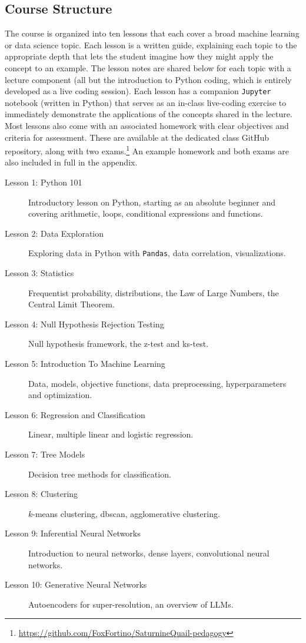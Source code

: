 \subsection{Course Structure}\label{sec:coursestructure}
The course is organized into ten lessons that each cover a broad machine learning or data science topic. Each lesson is a written guide, explaining each topic to the appropriate depth that lets the student imagine how they might apply the concept to an example. The lesson notes are shared below for each topic with a lecture component (all but the introduction to Python coding, which is entirely developed as a live coding session). Each lesson has a companion \texttt{Jupyter} notebook (written in Python) that serves as an in-class live-coding exercise to immediately demonstrate the applications of the concepts shared in the lecture. Most lessons also come with an associated homework with clear objectives and criteria for assessment. These are available at the dedicated class GitHub repository, along with two exams.\footnote{\url{https://github.com/FoxFortino/SaturnineQuail-pedagogy}} An example homework and both exams are also included in full in the appendix.

\begin{description}
    \item[Lesson 1: Python 101] Introductory lesson on Python, starting as an absolute beginner and covering arithmetic, loops, conditional expressions and functions.
    \item[Lesson 2: Data Exploration] Exploring data in Python with \texttt{Pandas}, data correlation, visualizations.
    \item[Lesson 3: Statistics] Frequentist probability, distributions, the Law of Large Numbers, the Central Limit Theorem.
    \item[Lesson 4: Null Hypothesis Rejection Testing] Null hypothesis framework, the z-test and ks-test.
    \item[Lesson 5: Introduction To Machine Learning] Data, models, objective functions, data preprocessing, hyperparameters and optimization.
    \item[Lesson 6: Regression and Classification] Linear, multiple linear and logistic regression.
    \item[Lesson 7: Tree Models] Decision tree methods for classification.
    \item[Lesson 8: Clustering] $k$-means clustering, dbscan, agglomerative clustering.
    \item[Lesson 9: Inferential Neural Networks] Introduction to neural networks, dense layers, convolutional neural networks.
    \item[Lesson 10: Generative Neural Networks] Autoencoders for super-resolution, an overview of LLMs.
\end{description}

